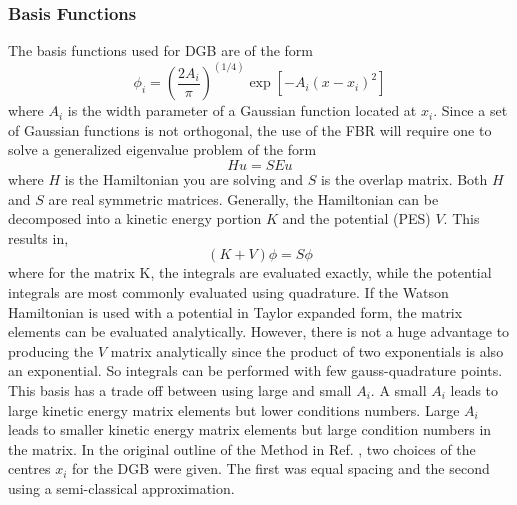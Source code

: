 \subsubsection{Basis Functions}
The basis functions used for DGB are of the form\cite{Hamilton1986}
\begin{equation}
\label{eq.p1}
\phi_i=\left(\dfrac{2 A_i}{\pi}\right)^{(1/4)}\exp\left[-A_i\left(x-x_i\right)^2\right]
\end{equation}
where $A_i$ is the width parameter of a Gaussian function located at $x_i$. Since a set of Gaussian functions is not orthogonal, the use of the FBR  will require one to solve a generalized eigenvalue problem of the form
\begin{equation}
Hu=SEu
\end{equation}
where $H$ is the Hamiltonian you are solving and $S$ is the overlap matrix.  Both $H$ and $S$ are real symmetric matrices. Generally, the Hamiltonian can be decomposed into a kinetic energy portion $K$ and the potential (PES) $V$.  This results in,
\begin{equation}
\label{eq.p2}
\left(K+V\right)\phi = S\phi
\end{equation}
where for the matrix K, the integrals are evaluated exactly, while the potential integrals are most commonly evaluated using quadrature.  If the Watson Hamiltonian\cite{Watson1968} is used with a potential in Taylor expanded form, the matrix elements can be evaluated analytically. However, there is not a huge advantage to producing the $V$ matrix analytically since the product of two exponentials is also an exponential. So integrals can be performed with few gauss-quadrature points.  
This basis has a trade off between using large and small $A_i$.  A small $A_i$ leads to large kinetic energy matrix elements but lower conditions numbers.  Large $A_i$ leads to smaller kinetic energy matrix elements but large condition numbers in the matrix\cite{Garashchuk2001}. In the original outline of the Method in Ref. , two choices of the centres $x_i$ for the DGB were given.  The first was equal spacing and the second using a semi-classical approximation. 



